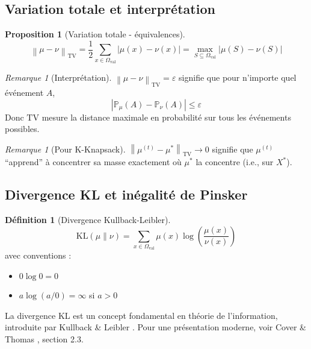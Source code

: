 \documentclass[12pt,a4paper]{article}
\newtheorem{proposition}[theorem]{Proposition}
\theoremstyle{definition}
\newtheorem{definition}[theorem]{Définition}
\theoremstyle{remark}
\newtheorem{remark}[theorem]{Remarque}
\newcommand{\Prob}{\mathbb{P}}
\newcommand{\KL}{\text{KL}}
\newcommand{\TV}{\text{TV}}
\newcommand{\norm}[1]{\left\|#1\right\|}
\begin{document}
	\subsection{Variation totale et interprétation}
	
	\begin{proposition}[Variation totale - équivalences]
		\begin{equation}
			\norm{\mu - \nu}_{\TV} = \frac{1}{2}\sum_{x\in\Omega_{\text{val}}} |\mu(x) - \nu(x)| = \max_{S\subseteq\Omega_{\text{val}}} |\mu(S) - \nu(S)|
		\end{equation}
	\end{proposition}
	
	\begin{remark}[Interprétation]
		$\norm{\mu - \nu}_{\TV} = \varepsilon$ signifie que pour n'importe quel événement $A$,
		\begin{equation}
			|\Prob_\mu(A) - \Prob_\nu(A)| \leq \varepsilon
		\end{equation}
		Donc $\TV$ mesure la distance maximale en probabilité sur tous les événements possibles.
	\end{remark}
	
	\begin{remark}[Pour K-Knapsack]
		$\norm{\mu^{(t)} - \mu^*}_{\TV} \to 0$ signifie que $\mu^{(t)}$ ``apprend'' à concentrer sa masse exactement où $\mu^*$ la concentre (i.e., sur $X^*$).
	\end{remark}
	
	\subsection{Divergence KL et inégalité de Pinsker}
	
	\begin{definition}[Divergence Kullback-Leibler]
		\begin{equation}
			\KL(\mu\|\nu) = \sum_{x\in\Omega_{\text{val}}} \mu(x) \log\left(\frac{\mu(x)}{\nu(x)}\right)
		\end{equation}
		avec conventions :
		\begin{itemize}
			\item $0 \log 0 = 0$
			\item $a \log(a/0) = \infty$ si $a > 0$
		\end{itemize}
		
		La divergence KL est un concept fondamental en théorie de l'information, introduite par Kullback \& Leibler \cite{kullback1951information}. Pour une présentation moderne, voir Cover \& Thomas \cite{cover2006elements}, section 2.3.
	\end{definition}
	
\end{document}
